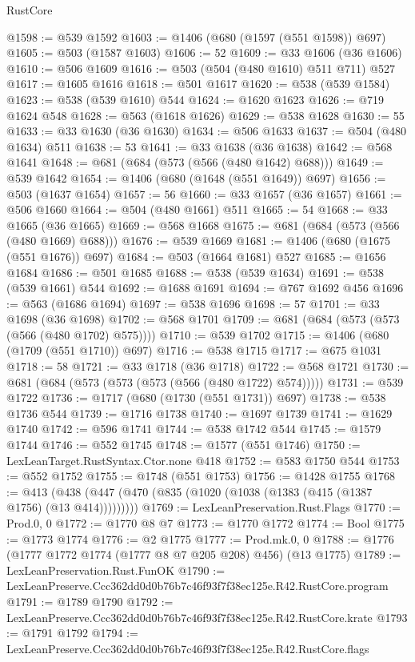 \begin{lexlean}{RustCore}
\begin{coremodule}
@1598 := @539 @1592
@1603 := @1406 (@680 (@1597 (@551 @1598)) @697)
@1605 := @503 (@1587 @1603)
@1606 := 52
@1609 := @33 @1606 (@36 @1606)
@1610 := @506 @1609
@1616 := @503 (@504 (@480 @1610) @511 @711) @527
@1617 := @1605 @1616
@1618 := @501 @1617
@1620 := @538 (@539 @1584)
@1623 := @538 (@539 @1610) @544
@1624 := @1620 @1623
@1626 := @719 @1624 @548
@1628 := @563 (@1618 @1626)
@1629 := @538 @1628
@1630 := 55
@1633 := @33 @1630 (@36 @1630)
@1634 := @506 @1633
@1637 := @504 (@480 @1634) @511
@1638 := 53
@1641 := @33 @1638 (@36 @1638)
@1642 := @568 @1641
@1648 := @681 (@684 (@573 (@566 (@480 @1642) @688)))
@1649 := @539 @1642
@1654 := @1406 (@680 (@1648 (@551 @1649)) @697)
@1656 := @503 (@1637 @1654)
@1657 := 56
@1660 := @33 @1657 (@36 @1657)
@1661 := @506 @1660
@1664 := @504 (@480 @1661) @511
@1665 := 54
@1668 := @33 @1665 (@36 @1665)
@1669 := @568 @1668
@1675 := @681 (@684 (@573 (@566 (@480 @1669) @688)))
@1676 := @539 @1669
@1681 := @1406 (@680 (@1675 (@551 @1676)) @697)
@1684 := @503 (@1664 @1681) @527
@1685 := @1656 @1684
@1686 := @501 @1685
@1688 := @538 (@539 @1634)
@1691 := @538 (@539 @1661) @544
@1692 := @1688 @1691
@1694 := @767 @1692 @456
@1696 := @563 (@1686 @1694)
@1697 := @538 @1696
@1698 := 57
@1701 := @33 @1698 (@36 @1698)
@1702 := @568 @1701
@1709 := @681 (@684 (@573 (@573 (@566 (@480 @1702) @575))))
@1710 := @539 @1702
@1715 := @1406 (@680 (@1709 (@551 @1710)) @697)
@1716 := @538 @1715
@1717 := @675 @1031
@1718 := 58
@1721 := @33 @1718 (@36 @1718)
@1722 := @568 @1721
@1730 := @681 (@684 (@573 (@573 (@573 (@566 (@480 @1722) @574)))))
@1731 := @539 @1722
@1736 := @1717 (@680 (@1730 (@551 @1731)) @697)
@1738 := @538 @1736 @544
@1739 := @1716 @1738
@1740 := @1697 @1739
@1741 := @1629 @1740
@1742 := @596 @1741
@1744 := @538 @1742 @544
@1745 := @1579 @1744
@1746 := @552 @1745
@1748 := @1577 (@551 @1746)
@1750 := LexLeanTarget.RustSyntax.Ctor.none @418
@1752 := @583 @1750 @544
@1753 := @552 @1752
@1755 := @1748 (@551 @1753)
@1756 := @1428 @1755
@1768 := @413 (@438 (@447 (@470 (@835 (@1020 (@1038 (@1383 (@415 (@1387 @1756) (@13 @414)))))))))
@1769 := LexLeanPreservation.Rust.Flags
@1770 := Prod.{0, 0}
@1772 := @1770 @8 @7
@1773 := @1770 @1772
@1774 := Bool
@1775 := @1773 @1774
@1776 := @2 @1775
@1777 := Prod.mk.{0, 0}
@1788 := @1776 (@1777 @1772 @1774 (@1777 @8 @7 @205 @208) @456) (@13 @1775)
@1789 := LexLeanPreservation.Rust.FunOK
@1790 := LexLeanPreserve.Ccc362dd0d0b76b7c46f93f7f38ec125e.R42.RustCore.program
@1791 := @1789 @1790
@1792 := LexLeanPreserve.Ccc362dd0d0b76b7c46f93f7f38ec125e.R42.RustCore.krate
@1793 := @1791 @1792
@1794 := LexLeanPreserve.Ccc362dd0d0b76b7c46f93f7f38ec125e.R42.RustCore.flags

\end{coremodule}
\end{lexlean}
